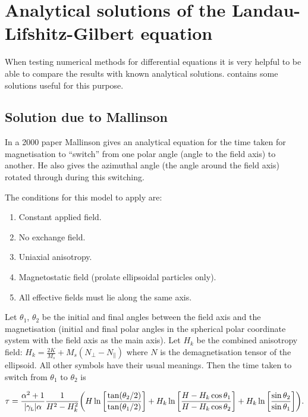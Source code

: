 \chapter{Analytical solutions of the Landau-Lifshitz-Gilbert equation}
\label{cha:analyt-solut-land}

When testing numerical methods for differential equations it is very helpful to be able to compare the results with known analytical solutions.
 contains some solutions useful for this purpose.

\section{Solution due to Mallinson}

In a 2000 paper \cite{Mallinson2000} Mallinson gives an analytical equation for the time taken for magnetisation to ``switch'' from one polar angle (angle to the field axis) to another.
He also gives the azimuthal angle (the angle around the field axis) rotated through during this switching.

The conditions for this model to apply are:
\begin{enumerate}
\item Constant applied field.
\item No exchange field.
\item Uniaxial anisotropy.
\item Magnetostatic field (prolate ellipsoidal particles only).
\item All effective fields must lie along the same axis.
\end{enumerate}

Let $\theta_1$, $\theta_2$ be the initial and final angles between the field axis and the magnetisation (\ie initial and final polar angles in the spherical polar coordinate system with the field axis as the main axis). Let $H_k$ be the combined anisotropy field: $H_k = \frac{2 K}{M_s} + M_s(N_\perp - N_\parallel)$ where $N$ is the demagnetisation tensor of the ellipsoid. All other symbols have their usual meanings. Then the time taken to switch from $\theta_1$ to $\theta_2$ is

\begin{equation}
  \tau = \frac{\alpha^2 +1}{{\left|{\gamma_{\text{\tiny{L}}}} \right|} \alpha} \frac{1}{H^2 - H_k^2}
  {\left(  H \ln {\left[  \frac{\tan(\theta_2/2)}{\tan(\theta_1/2)}  \right]}
       + H_k \ln {\left[  \frac{H - H_k \cos\theta_1}{H - H_k \cos\theta_2}  \right]}
       + H_k \ln {\left[  \frac{\sin\theta_2}{\sin\theta_1}  \right]}
      \right)}.
\end{equation}

